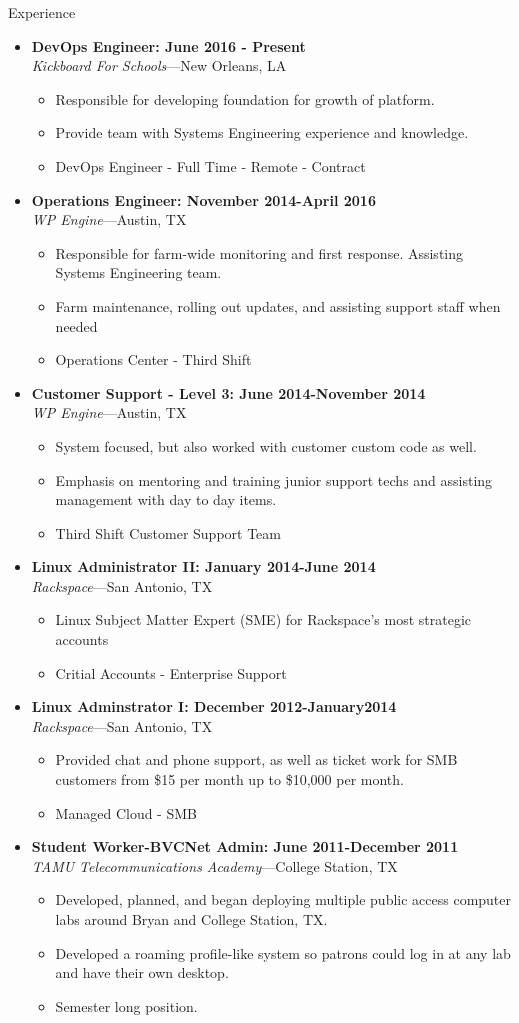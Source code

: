 \documentclass[10pt,oneside]{article}
\newenvironment{ressection}[1]{
    \vspace{4pt}
    {\fontfamily{phv}\selectfont\Large#1}
    \begin{itemize}
    \vspace{3pt}
}{
    \end{itemize}
}
\newcommand{\ressubitem}[1]{
    \vspace{-1pt}
    \item \begin{flushleft} #1 \end{flushleft}
}
\newcommand{\resbigitem}[3]{
    \vspace{-5pt}
    \item
    \textbf{#3} \\
    \textit{#1}---#2
}
\newenvironment{ressubsec}[3]{
    \resbigitem{#1}{#2}{#3}
    \vspace{-2pt}
    \begin{itemize}
}{
    \end{itemize}
}
\begin{document}
\begin{ressection}{Experience}

    \begin{ressubsec}{Kickboard For Schools}{New Orleans, LA}{DevOps Engineer: June 2016 - Present}
        \ressubitem{Responsible for developing foundation for growth of platform.}
        \ressubitem{Provide team with Systems Engineering experience and knowledge.}
        \ressubitem{DevOps Engineer - Full Time - Remote - Contract}
    \end{ressubsec}

    \begin{ressubsec}{WP Engine}{Austin, TX}{Operations Engineer: November 2014-April 2016}
        \ressubitem{Responsible for farm-wide monitoring and first response.  Assisting Systems Engineering team.}
        \ressubitem{Farm maintenance, rolling out updates, and assisting support staff when needed}
        \ressubitem{Operations Center - Third Shift}
    \end{ressubsec}

    \begin{ressubsec}{WP Engine}{Austin, TX}{Customer Support - Level 3: June 2014-November 2014}
        \ressubitem{System focused, but also worked with customer custom code as well.}
        \ressubitem{Emphasis on mentoring and training junior support techs and assisting management with day to day items.}
        \ressubitem{Third Shift Customer Support Team}
    \end{ressubsec}

    \begin{ressubsec}{Rackspace}{San Antonio, TX}{Linux Administrator II: January 2014-June 2014}
        \ressubitem{Linux Subject Matter Expert (SME) for Rackspace's most strategic accounts}
        \ressubitem{Critial Accounts - Enterprise Support}
    \end{ressubsec}

    \begin{ressubsec}{Rackspace}{San Antonio, TX}{Linux Adminstrator I: December 2012-January2014}
        \ressubitem{Provided chat and phone support, as well as ticket work for SMB customers from \$15 per month up to \$10,000 per month.}
        \ressubitem{Managed Cloud - SMB}
    \end{ressubsec}
    \begin{ressubsec}{TAMU Telecommunications Academy}{College Station, TX}{Student Worker-BVCNet Admin: June 2011-December 2011}
        \ressubitem{Developed, planned, and began deploying multiple public access computer labs around Bryan and College Station, TX.}
        \ressubitem{Developed a roaming profile-like system so patrons could log in at any lab and have their own desktop.}
        \ressubitem{Semester long position.}
    \end{ressubsec}


\end{ressection}
\end{document}
